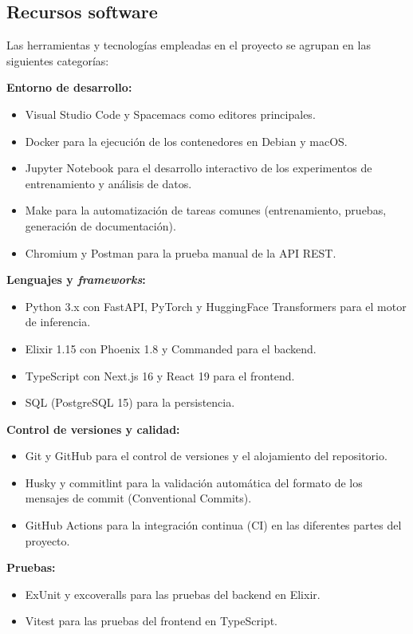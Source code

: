 \subsection{Recursos software}

Las herramientas y tecnologías empleadas en el proyecto se agrupan en las siguientes categorías:

\textbf{Entorno de desarrollo:}
\begin{itemize}[noitemsep]
 \item Visual Studio Code y Spacemacs como editores principales.
 \item Docker para la ejecución de los contenedores en Debian y macOS.
 \item Jupyter Notebook para el desarrollo interactivo de los experimentos de entrenamiento y análisis de datos.
 \item Make para la automatización de tareas comunes (entrenamiento, pruebas, generación de documentación).
 \item Chromium y Postman para la prueba manual de la API REST.
\end{itemize}

\textbf{Lenguajes y \emph{frameworks}:}
\begin{itemize}[noitemsep]
 \item Python 3.x con FastAPI, PyTorch y HuggingFace Transformers para el motor de inferencia.
 \item Elixir 1.15 con Phoenix 1.8 y Commanded para el backend.
 \item TypeScript con Next.js 16 y React 19 para el frontend.
 \item SQL (PostgreSQL 15) para la persistencia.
\end{itemize}

\textbf{Control de versiones y calidad:}
\begin{itemize}[noitemsep]
 \item Git y GitHub para el control de versiones y el alojamiento del repositorio.
 \item Husky y commitlint para la validación automática del formato de los mensajes de commit (Conventional Commits).
 \item GitHub Actions para la integración continua (CI) en las diferentes partes del proyecto.
\end{itemize}

\textbf{Pruebas:}
\begin{itemize}[noitemsep]
 \item ExUnit y excoveralls para las pruebas del backend en Elixir.
 \item Vitest para las pruebas del frontend en TypeScript.
\end{itemize}

